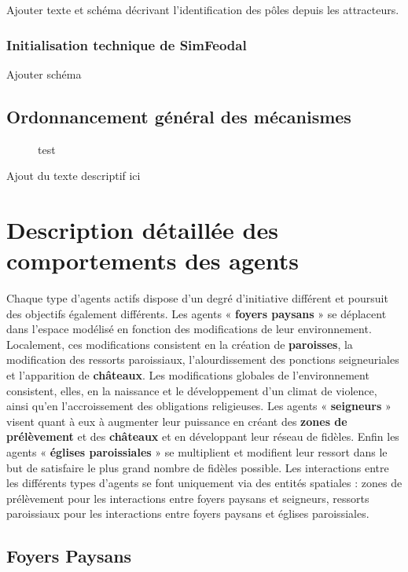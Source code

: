 {\blueroman Ajouter texte et schéma décrivant l'identification des pôles depuis les attracteurs.}

\subsubsection{Initialisation technique de SimFeodal}

{\blueroman Ajouter schéma}

\subsection{Ordonnancement général des mécanismes}
{\blueroman
\begin{figure}[H]
	
	\caption{test}
\end{figure}

Ajout du texte descriptif ici
}

\clearpage	
\section[Comportements des agents]{Description détaillée des comportements des agents}

Chaque type d'agents actifs dispose d'un degré d'initiative différent et poursuit des objectifs également différents.
Les agents « \textbf{foyers paysans} » se déplacent dans l'espace modélisé en fonction des modifications de leur environnement.
Localement, ces modifications consistent en la création de \textbf{paroisses}, la modification des ressorts paroissiaux, l'alourdissement des ponctions seigneuriales et l'apparition de \textbf{châteaux}.
Les modifications globales de l'environnement consistent, elles, en la naissance et le développement d'un climat de violence, ainsi qu'en l'accroissement des obligations religieuses.
Les agents « \textbf{seigneurs} » visent quant à eux à augmenter leur puissance en créant des \textbf{zones de prélèvement} et des \textbf{châteaux} et en développant leur réseau de fidèles.
Enfin les agents « \textbf{églises paroissiales} » se multiplient et modifient leur ressort dans le but de satisfaire le plus grand nombre de fidèles possible.
Les interactions entre les différents types d'agents se font uniquement via des entités spatiales : zones de prélèvement pour les interactions entre foyers paysans et seigneurs, ressorts paroissiaux pour les interactions entre foyers paysans et églises paroissiales.


\subsection{Foyers Paysans}

